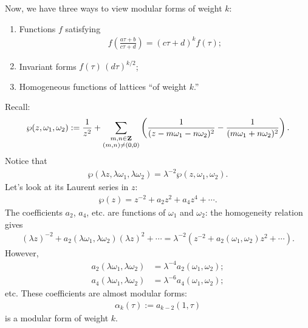 \documentclass[11pt, oneside,margin=1in]{article}
\begin{document}
Now, we have three ways to view modular forms of weight $k$:
\begin{enumerate}
	\item Functions $f$ satisfying
		\begin{align*}
			f\left( \frac{a\tau+b}{c\tau+d} \right) = (c\tau+d) ^k f(\tau) ;
		\end{align*}
	\item Invariant forms $f(\tau) \,  (d\tau) ^{k/2}$;
	\item Homogeneous functions of lattices ``of weight $k$.''
\end{enumerate}

\begin{example}\label{}\text{}
Recall:
\begin{align*}
	\wp(z,\omega_1,\omega_2) := \frac{1}{z^2} + \sum_{\substack{m,n\in \mathbf Z\\(m,n)\ne (0,0)}}^{}\left( \frac{1}{(z- m\omega_1 - n\omega_2)^2} - \frac{1}{(m\omega_1 + n\omega_2)^2}\right).
\end{align*}
Notice that
\begin{align*}
	\wp (\lambda z,\lambda \omega_1,\lambda\omega_2) = \lambda^{-2} \wp(z,\omega_1,\omega_2).
\end{align*}
Let's look at its Laurent series in $z$:
\begin{align*}
	\wp(z) = z^{-2} + a_2z^2 + a_4z^4 + \cdots.
\end{align*}
The coefficients $a_2$, $a_4$, etc. are functions of $\omega_1$ and $\omega_2$: the homogeneity relation gives
\begin{align*}
	(\lambda z)^{-2} +  a_2(\lambda\omega_1,\lambda\omega_2) (\lambda z)^2 + \cdots = \lambda^{-2}  (z^{-2} + a_2(\omega_1,\omega_2)z^2+\cdots).
\end{align*}
However,
\begin{align*}
	a_2(\lambda\omega_1,\lambda\omega_2) &= \lambda^{-4} a_2(\omega_1,\omega_2);\\
	a_4(\lambda \omega_1,\lambda\omega_2) &= \lambda^{-6} a_4(\omega_1,\omega_2);
\end{align*}
etc. These coefficients are almost modular forms:
\begin{align*}
	\alpha_k (\tau) := a_{k-2}(1,\tau)
\end{align*}
is a modular form of weight $k$. 


\end{example}
\end{document}

